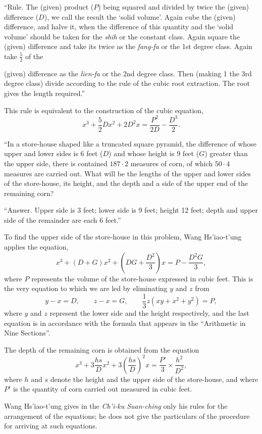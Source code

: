 \documentclass[11pt]{article}
\newcommand{\scanpage}[2]{\clearpage\setcounter{footnote}{0}\noindent{\footnotesize\color{gray}PDF page #1 · #2}\par\medskip}
\newcommand{\scanfooter}{}
\begin{document}
``Rule. The (given) product ($P$) being squared and divided by twice the (given) difference ($D$), we call the result the `solid volume'. Again cube the (given) difference, and halve it, when the difference of this quantity and the `solid volume' should be taken for the \emph{shih} or the constant class. Again square the (given) difference and take its twice as the \emph{fang-fa} or the 1st degree class. Again take $\frac{5}{2}$ of the
\scanfooter

\scanpage{0069}{Chapter 8, printed page 55}
(given) difference as the \emph{lien-fa} or the 2nd degree class. Then (making 1 the 3rd degree class) divide according to the rule of the cubic root extraction. The root gives the length required.''

This rule is equivalent to the construction of the cubic equation,
\[
x^3+\frac{5}{2}Dx^2+2D^2x=\frac{P^2}{2D}-\frac{D^3}{2}.
\]

``In a store-house shaped like a truncated square pyramid, the difference of whose upper and lower sides is 6 feet ($D$) and whose height is 9 feet ($G$) greater than the upper side, there is contained $187\cdot2$ measures of corn, of which $50\cdot4$ measures are carried out. What will be the lengths of the upper and lower sides of the store-house, its height, and the depth and a side of the upper end of the remaining corn?

``Answer. Upper side is 3 feet; lower side is 9 feet; height 12 feet; depth and upper side of the remainder are each 6 feet.''

To find the upper side of the store-house in this problem, Wang Hs'iao-t'ung applies the equation,
\[
x^3+(D+G)x^2+\left(DG+\frac{D^2}{3}\right)x=P-\frac{D^2G}{3},
\]
where $P$ represents the volume of the store-house expressed in cubic feet. This is the very equation to which we are led by eliminating $y$ and $z$ from
\[
y-x=D,\qquad z-x=G,\qquad \frac{1}{3}z(xy+x^2+y^2)=P,
\]
where $y$ and $z$ represent the lower side and the height respectively, and the last equation is in accordance with the formula that appears in the ``Arithmetic in Nine Sections''.

The depth of the remaining corn is obtained from the equation
\[
x^3+3\frac{hs}{D}x^2+3\left(\frac{hs}{D}\right)^2x=\frac{P'}{3}\times\frac{h^2}{D^2},
\]
where $h$ and $s$ denote the height and the upper side of the store-house, and where $P'$ is the quantity of corn carried out measured in cubic feet.

Wang Hs'iao-t'ung gives in the \emph{Ch'i-ku Suan-ching} only his rules for the arrangement of the equations; he does not give the particulars of the procedure for arriving at such equations.
\end{document}
